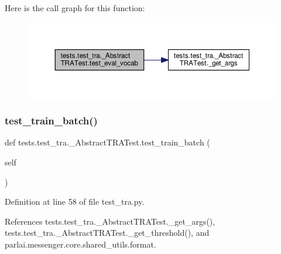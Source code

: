 Here is the call graph for this function\+:
\nopagebreak
\begin{figure}[H]
\begin{center}
\leavevmode
\includegraphics[width=350pt]{classtests_1_1test__tra_1_1__AbstractTRATest_a4576c8054384ac195a275851d2cd3e4f_cgraph}
\end{center}
\end{figure}
\mbox{\label{classtests_1_1test__tra_1_1__AbstractTRATest_a00c2874cb33f155fa829cc7783d5d724}} 
\subsubsection{\texorpdfstring{test\+\_\+train\+\_\+batch()}{test\_train\_batch()}}
{\footnotesize\ttfamily def tests.\+test\+\_\+tra.\+\_\+\+Abstract\+T\+R\+A\+Test.\+test\+\_\+train\+\_\+batch (\begin{DoxyParamCaption}\item[{}]{self }\end{DoxyParamCaption})}



Definition at line 58 of file test\+\_\+tra.\+py.



References tests.\+test\+\_\+tra.\+\_\+\+Abstract\+T\+R\+A\+Test.\+\_\+get\+\_\+args(), tests.\+test\+\_\+tra.\+\_\+\+Abstract\+T\+R\+A\+Test.\+\_\+get\+\_\+threshold(), and parlai.\+messenger.\+core.\+shared\+\_\+utils.\+format.

